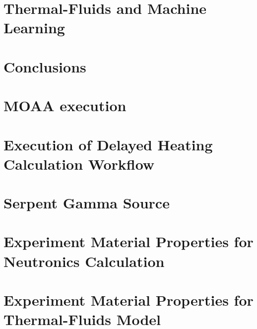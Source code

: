 \documentclass{uiucthesis2021}
\newcounter{counterforappendices}
\begin{document}
\chapter{Thermal-Fluids and Machine Learning}


\chapter{Conclusions}


\backmatter
\printbibliography[heading=bibintoc, title={References}]

\clearpage
\setcounter{counterforappendices}{\value{page}}
\mainmatter
\setcounter{page}{\value{counterforappendices}}
\appendix

\chapter{MOAA execution}


\chapter{Execution of Delayed Heating Calculation Workflow}


\chapter{Serpent Gamma Source}


\chapter{Experiment Material Properties for Neutronics Calculation}


\chapter{Experiment Material Properties for Thermal-Fluids Model}

\end{document}
